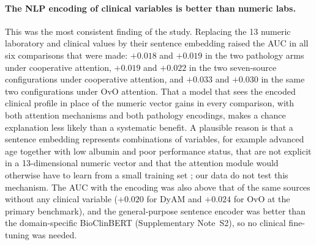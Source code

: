 \paragraph{The NLP encoding of clinical variables is better than numeric labs.}
This was the most consistent finding of the study. Replacing the 13 numeric laboratory and clinical values by their
sentence embedding raised the AUC in all six comparisons that were made: $+0.018$ and $+0.019$ in the two pathology arms
under cooperative attention, $+0.019$ and $+0.022$ in the two seven-source configurations under cooperative attention, and
$+0.033$ and $+0.030$ in the same two configurations under OvO attention.
That a model that sees the encoded clinical profile in place of the numeric vector gains in every comparison, with both
attention mechanisms and both pathology encodings, makes a chance explanation less likely than a systematic benefit.
A plausible reason is that a sentence embedding represents combinations of variables, for example advanced age together
with low albumin and poor performance status, that are not explicit in a 13-dimensional numeric vector and that the
attention module would otherwise have to learn from a small training set \cite{Reimers2019,Wang2020MiniLM}; our data do
not test this mechanism.
The AUC with the encoding was also above that of the same sources without any clinical variable
($+0.020$ for DyAM and $+0.024$ for OvO at the primary benchmark), and the general-purpose sentence encoder was better than
the domain-specific BioClinBERT (Supplementary Note~S2), so no clinical fine-tuning was needed.

